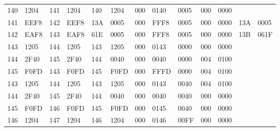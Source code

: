 \documentclass[14pt]{extreport}
\begin{document}
\begin{landscape}
\begin{tabular}{|l|l|l|l|l|l|l|l|l|l|l|l|l|}
                    140 & 1204 & 141 & 1204 & 140 & 1204 & 000 & 0140 & 0005 & 000 & 0000 &&\\
                    141 & EEF8 & 142 & EEF8 & 13A & 0005 & 000 & FFF8 & 0005 & 000 & 0000 & 13A & 0005 \\
                    142 & EAF8 & 143 & EAF8 & 61E & 0005 & 000 & FFF8 & 0005 & 000 & 0000 & 13B & 061F \\
                    143 & 1205 & 144 & 1205 & 143 & 1205 & 000 & 0143 & 0000 & 000 & 0000 &&\\
                    144 & 2F40 & 145 & 2F40 & 144 & 0040 & 000 & 0040 & 0000 & 004 & 0100 &&\\
                    145 & F0FD & 143 & F0FD & 145 & F0FD & 000 & FFFD & 0000 & 004 & 0100 &&\\
                    143 & 1205 & 144 & 1205 & 143 & 1205 & 000 & 0143 & 0040 & 004 & 0100 &&\\
                    144 & 2F40 & 145 & 2F40 & 144 & 0040 & 000 & 0040 & 0040 & 000 & 0000 &&\\
                    145 & F0FD & 146 & F0FD & 145 & F0FD & 000 & 0145 & 0040 & 000 & 0000 &&\\
                    146 & 1204 & 147 & 1204 & 146 & 1204 & 000 & 0146 & 00FF & 000 & 0000 &&\\


\end{tabular}
\end{landscape}
\end{document}

